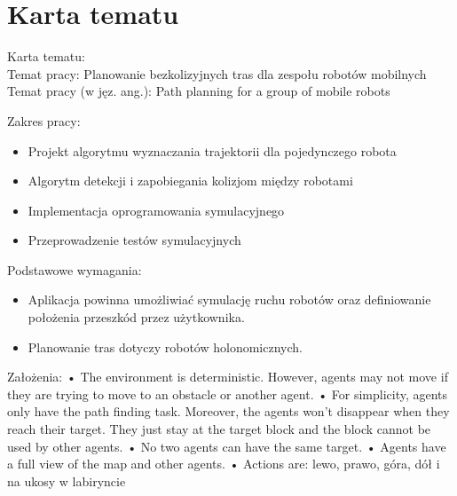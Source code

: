 \chapter{Karta tematu}
\label{ch:topic}

Karta tematu: \\
Temat pracy: Planowanie bezkolizyjnych tras dla zespołu robotów mobilnych \\
Temat pracy (w jęz. ang.): Path planning for a group of mobile robots

Zakres pracy:
\begin{itemize}
	\item Projekt algorytmu wyznaczania trajektorii dla pojedynczego robota
	\item Algorytm detekcji i zapobiegania kolizjom między robotami
	\item Implementacja oprogramowania symulacyjnego
	\item Przeprowadzenie testów symulacyjnych
\end{itemize}

Podstawowe wymagania:
\begin{itemize}
	\item Aplikacja powinna umożliwiać symulację ruchu robotów oraz definiowanie położenia przeszkód przez użytkownika.
	\item Planowanie tras dotyczy robotów holonomicznych.
\end{itemize}

Założenia:
• The environment is deterministic. However, agents may not move if they are trying to move to an obstacle or another agent.
• For simplicity, agents only have the path finding task. Moreover, the agents won’t disappear when they reach their target. They just stay at the target block and the block cannot be used by other agents.
• No two agents can have the same target.
• Agents have a full view of the map and other agents.
• Actions are: lewo, prawo, góra, dół i na ukosy w labiryncie

